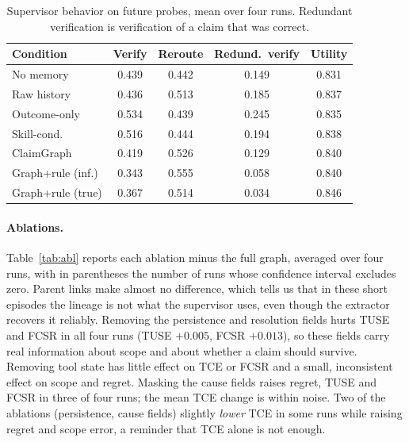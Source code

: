 \documentclass[letterpaper]{article}
\begin{document}
\begin{table}[t]
\centering\scriptsize
\setlength{\tabcolsep}{3pt}
\begin{tabular}{lcccc}
\toprule
Condition & Verify & Reroute & Redund.\ verify & Utility\\
\midrule
No memory & 0.439 & 0.442 & 0.149 & 0.831 \\
Raw history & 0.436 & 0.513 & 0.185 & 0.837 \\
Outcome-only & 0.534 & 0.439 & 0.245 & 0.835 \\
Skill-cond. & 0.516 & 0.444 & 0.194 & 0.838 \\
ClaimGraph & 0.419 & 0.526 & 0.129 & 0.840 \\
Graph+rule (inf.) & 0.343 & 0.555 & 0.058 & 0.840 \\
Graph+rule (true) & 0.367 & 0.514 & 0.034 & 0.846 \\
\bottomrule
\end{tabular}
\caption{Supervisor behavior on future probes, mean over four runs. Redundant verification is verification of a claim that was correct.}
\label{tab:beh}
\end{table}

\paragraph{Ablations.}
Table~\ref{tab:abl} reports each ablation minus the full graph, averaged over four runs, with in parentheses the number of runs whose confidence interval excludes zero. Parent links make almost no difference, which tells us that in these short episodes the lineage is not what the supervisor uses, even though the extractor recovers it reliably. Removing the persistence and resolution fields hurts TUSE and FCSR in all four runs (TUSE $+0.005$, FCSR $+0.013$), so these fields carry real information about scope and about whether a claim should survive. Removing tool state has little effect on TCE or FCSR and a small, inconsistent effect on scope and regret. Masking the cause fields raises regret, TUSE and FCSR in three of four runs; the mean TCE change is within noise. Two of the ablations (persistence, cause fields) slightly \emph{lower} TCE in some runs while raising regret and scope error, a reminder that TCE alone is not enough.
\end{document}
